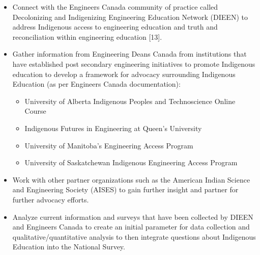 \begin{itemize}
 \item Connect with the Engineers Canada community of practice called Decolonizing and Indigenizing Engineering Education Network (DIEEN) to address Indigenous access to engineering education and truth and reconciliation within engineering education [13].
 \item Gather information from Engineering Deans Canada from institutions that have established post secondary engineering initiatives to promote Indigenous education to develop a framework for advocacy surrounding Indigenous Education (as per Engineers Canada documentation):
 \begin{itemize}
  \item University of Alberta Indigenous Peoples and Technoscience Online Course
  \item Indigenous Futures in Engineering at Queen's University
  \item University of Manitoba's Engineering Access Program
  \item University of Saskatchewan Indigenous Engineering Access Program
 \end{itemize}
 \item Work with other partner organizations such as the American Indian Science and Engineering Society (AISES) to gain further insight and partner for further advocacy efforts.
 \item Analyze current information and surveys that have been collected by DIEEN and Engineers Canada to create an initial parameter for data collection and qualitative/quantitative analysis to then integrate questions about Indigenous Education into the National Survey.
\end{itemize}

\newpage
